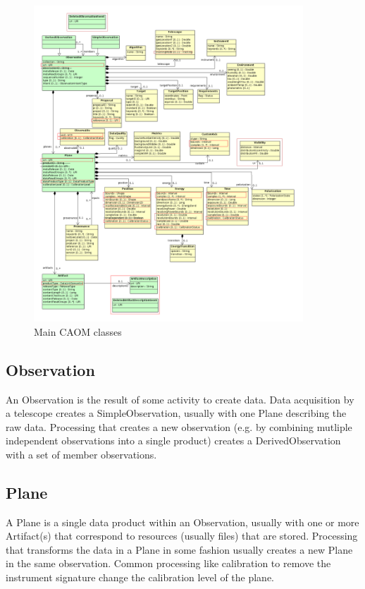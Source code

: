 \documentclass[11pt,a4paper]{ivoa}
\begin{document}
\begin{figure}
\centering
\includegraphics[width=0.9\textwidth]{src/uml/CAOM1core.png}
\caption{Main CAOM classes}
\label{fig:core}
\end{figure}

\subsection{Observation}

An Observation is the result of some activity to create data. Data acquisition by a 
telescope creates a SimpleObservation, usually with one Plane describing the raw 
data. Processing that creates a new observation (e.g. by combining mutliple independent
observations into a single product) creates a DerivedObservation with a set of member
observations. 

\subsection{Plane}

A Plane is a single data product within an Observation, usually with one or more
Artifact(s) that correspond to resources (usually files) that are stored. Processing
that transforms the data in a Plane in some fashion usually creates a new Plane in
the same observation. Common processing like calibration to remove the instrument
signature change the calibration level of the plane.
\end{document}
